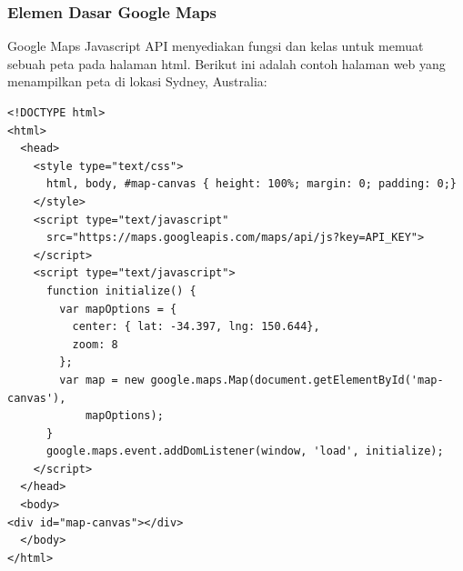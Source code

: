 \subsubsection{Elemen Dasar Google Maps}
Google Maps Javascript API menyediakan fungsi dan kelas untuk memuat sebuah peta
pada halaman html. Berikut ini adalah contoh halaman web yang menampilkan peta
di lokasi Sydney, Australia:
\lstset{
  language=HTML
}
\begin{lstlisting}
<!DOCTYPE html>
<html>
  <head>
    <style type="text/css">
      html, body, #map-canvas { height: 100%; margin: 0; padding: 0;}
    </style>
    <script type="text/javascript"
      src="https://maps.googleapis.com/maps/api/js?key=API_KEY">
    </script>
    <script type="text/javascript">
      function initialize() {
        var mapOptions = {
          center: { lat: -34.397, lng: 150.644},
          zoom: 8
        };
        var map = new google.maps.Map(document.getElementById('map-canvas'),
            mapOptions);
      }
      google.maps.event.addDomListener(window, 'load', initialize);
    </script>
  </head>
  <body>
<div id="map-canvas"></div>
  </body>
</html>
\end{lstlisting}
